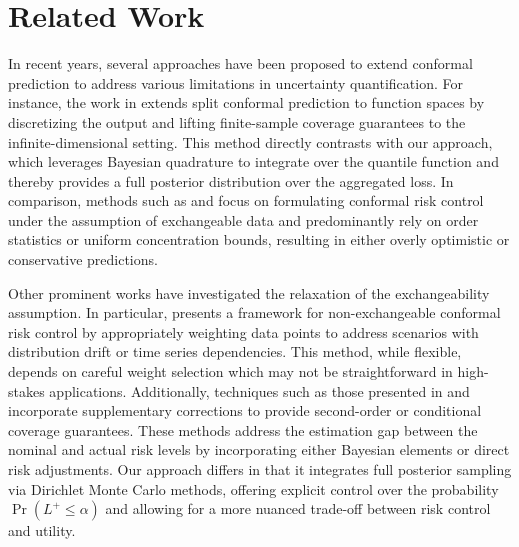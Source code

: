 \documentclass{article} %
\begin{document}
\section{Related Work}
In recent years, several approaches have been proposed to extend conformal prediction to address various limitations in uncertainty quantification. For instance, the work in \cite{millard2025splitconformalpredictionfunction} extends split conformal prediction to function spaces by discretizing the output and lifting finite-sample coverage guarantees to the infinite-dimensional setting. This method directly contrasts with our approach, which leverages Bayesian quadrature to integrate over the quantile function and thereby provides a full posterior distribution over the aggregated loss. In comparison, methods such as \cite{angelopoulos2025conformalriskcontrol} and \cite{hulsman2025conformalriskcontrolpulmonary} focus on formulating conformal risk control under the assumption of exchangeable data and predominantly rely on order statistics or uniform concentration bounds, resulting in either overly optimistic or conservative predictions.

Other prominent works have investigated the relaxation of the exchangeability assumption. In particular, \cite{farinhas2024nonexchangeableconformalriskcontrol} presents a framework for non-exchangeable conformal risk control by appropriately weighting data points to address scenarios with distribution drift or time series dependencies. This method, while flexible, depends on careful weight selection which may not be straightforward in high-stakes applications. Additionally, techniques such as those presented in \cite{javanmardi2025optimalconformalpredictionepistemic} and \cite{gao2024adjustingregressionmodelsconditional} incorporate supplementary corrections to provide second-order or conditional coverage guarantees. These methods address the estimation gap between the nominal and actual risk levels by incorporating either Bayesian elements or direct risk adjustments. Our approach differs in that it integrates full posterior sampling via Dirichlet Monte Carlo methods, offering explicit control over the probability $\Pr(L^+ \leq \alpha)$ and allowing for a more nuanced trade-off between risk control and utility.
\end{document}
